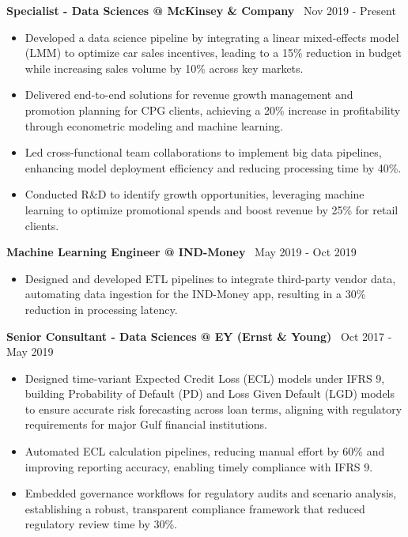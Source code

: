 \documentclass[a4paper,10pt]{article}
\begin{document}
\textbf{\large Specialist - Data Sciences @ McKinsey \& Company} \hfill \faCalendar \, Nov 2019 - Present
\begin{itemize}
    \item Developed a data science pipeline by integrating a linear mixed-effects model (LMM) to optimize car sales incentives, leading to a 15\% reduction in budget while increasing sales volume by 10\% across key markets.
    \item Delivered end-to-end solutions for revenue growth management and promotion planning for CPG clients, achieving a 20\% increase in profitability through econometric modeling and machine learning.
    \item Led cross-functional team collaborations to implement big data pipelines, enhancing model deployment efficiency and reducing processing time by 40\%.
    \item Conducted R\&D to identify growth opportunities, leveraging machine learning to optimize promotional spends and boost revenue by 25\% for retail clients.
\end{itemize}

\textbf{\large Machine Learning Engineer @ IND-Money} \hfill \faCalendar \, May 2019 - Oct 2019
\begin{itemize}
    \item Designed and developed ETL pipelines to integrate third-party vendor data, automating data ingestion for the IND-Money app, resulting in a 30\% reduction in processing latency.
\end{itemize}

\textbf{\large Senior Consultant - Data Sciences @ EY (Ernst \& Young)} \hfill \faCalendar \, Oct 2017 - May 2019
\begin{itemize}
    \item Designed time-variant Expected Credit Loss (ECL) models under IFRS 9, building Probability of Default (PD) and Loss Given Default (LGD) models to ensure accurate risk forecasting across loan terms, aligning with regulatory requirements for major Gulf financial institutions.
    \item Automated ECL calculation pipelines, reducing manual effort by 60\% and improving reporting accuracy, enabling timely compliance with IFRS 9.
    \item Embedded governance workflows for regulatory audits and scenario analysis, establishing a robust, transparent compliance framework that reduced regulatory review time by 30\%.
\end{itemize}
\end{document}
